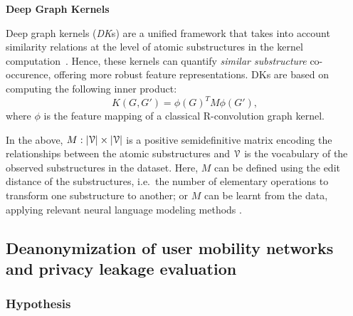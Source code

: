 \vspace{1em}
\noindent\textbf{Deep Graph Kernels}

Deep graph kernels (\emph{DK}s) are a unified framework that takes into account similarity relations at the level of atomic substructures in the kernel computation~\cite{yanardagV15}.
Hence, these kernels can quantify \emph{similar substructure} co-occurence, offering more robust feature representations.
DKs are based on computing the following inner product:
\[
K(G, G') = \phi\left(G\right)^T M \phi\left(G'\right),
\]
where $ \phi $ is the feature mapping of a classical R-convolution graph kernel.

In the above, $M : |\mathcal{V}| \times |\mathcal{V}|$ is a positive semidefinitive matrix encoding the relationships between the atomic substructures and $ \mathcal{V} $ is the vocabulary of the observed substructures in the dataset.
Here, $ M $ can be defined using the edit distance of the substructures, i.e.\ the number of elementary operations to transform one substructure to another; or $ M $ can be learnt from the data, applying relevant neural language modeling methods \cite{mikolov2013efficient}.

\subsection{Deanonymization of user mobility networks and privacy leakage evaluation\label{sec:deanon-leakage}}

\subsubsection{Hypothesis}

